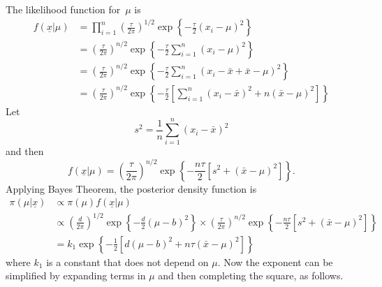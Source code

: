 {{        The likelihood function for~$\mu$ is
        \begin{align*}
        f(\underline{x}|\mu)&=\prod_{i=1}^n 
        \left(\frac{\tau}{2\pi}\right)^{1/2}
        \exp\left\{-\frac{\tau}{2}(x_i-\mu)^2\right\}  \\
        &= \left(\frac{\tau}{2\pi}\right)^{n/2}
        \exp\left\{-\frac{\tau}{2}\sum_{i=1}^n (x_i-\mu)^2\right\} \\
        &= \left(\frac{\tau}{2\pi}\right)^{n/2}
        \exp\left\{-\frac{\tau}{2}\sum_{i=1}^n (x_i-\bar x+\bar x-\mu)^2\right\} \\
        &= \left(\frac{\tau}{2\pi}\right)^{n/2}
        \exp\left\{-\frac{\tau}{2}\left[\sum_{i=1}^n (x_i-\bar x)^2+n(\bar x-\mu)^2\right]\right\} 
        \end{align*}
        Let
        $$s^2 =\frac{1}{n}\sum_{i=1}^n (x_i-\bar x)^2$$
        and then
        \begin{equation}
        f(\underline{x} | \mu) = \left(\frac{\tau}{2\pi}\right)^{n/2}
        \exp\left\{-\frac{n\tau}{2}\left[s^2+(\bar x-\mu)^2\right]\right\}. \label{eq:p10}
        \end{equation}
        Applying Bayes Theorem, the posterior density function is
        \begin{align*}
        \pi(\mu|\underline{x})&\propto\pi(\mu)f(\underline{x} | \mu)\\
        &\propto \left(\frac{d}{2\pi}\right)^{1/2}\exp\left\{-\frac{d}{2}(\mu-b)^2\right\} \times \left(\frac{\tau}{2\pi}\right)^{n/2}
        \exp\left\{-\frac{n\tau}{2}\left[s^2+(\bar x-\mu)^2\right]\right\} \\
        &=k_1\exp\left\{-\frac{1}{2}\left[d(\mu-b)^2+n\tau(\bar x-\mu)^2\right]\right\}
        \end{align*}
        where $k_1$ is a constant that does not depend on $\mu$. Now the
        exponent can be simplified by expanding terms in $\mu$ and then
        completing the square, as follows.
        
    
}

\newpage

{
    
}}
